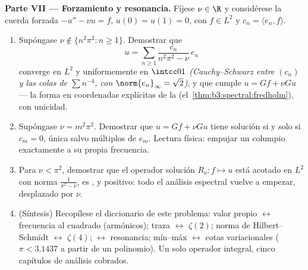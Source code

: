 \begin{problem}
\medskip
\noindent\textbf{Parte VII --- Forzamiento y resonancia.} Fíjese
$\nu \in \R$ y considérese la cuerda forzada $-u'' - \nu u =
f$, $u(0) = u(1) = 0$, con $f \in L^2$ y $c_n = \langle
e_n, f\rangle$.
\begin{enumerate}[resume]
  \item Supóngase $\nu \notin \{n^2\pi^2 : n \geq 1\}$. Demostrar que
        \[
        u = \sum_{n\geq1}\frac{c_n}{n^2\pi^2 - \nu}\,e_n
        \]
        converge en $L^2$ y uniformemente en $\intcc01$
        \emph{(Cauchy--Schwarz entre $(c_n)$ y las colas de
        $\sum n^{-4}$, con $\norm{e_n}_\infty =
        \sqrt2$)}, y que cumple $u = Gf + \nu Gu$ --- la forma en
        coordenadas explícitas de la
        (el~\cref{thm:b3:spectral:fredholm}), con unicidad. \item
        Supóngase $\nu = m^2\pi^2$. Demostrar que $u = Gf + \nu
        Gu$ tiene solución si y solo si $c_m = 0$, única salvo múltiplos
        de $e_m$. Lectura física: empujar un columpio exactamente a su
        propia frecuencia. \item Para $\nu < \pi^2$, demostrar que el
        operador solución $R_\nu\colon f \mapsto u$ está acotado en
        $L^2$ con norma $\frac1{\pi^2 - \nu}$, es
        ,
         y positivo:
        todo el análisis espectral vuelve a empezar, desplazado por
        $\nu$. \item (Síntesis) Recopílese el diccionario de este
        problema: valor propio $\leftrightarrow$ frecuencia al cuadrado
        (armónicos); traza $\leftrightarrow$ $\zeta(2)$; norma de
        Hilbert--Schmidt $\leftrightarrow$ $\zeta(4)$;
        $\leftrightarrow$ resonancia; mín--máx $\leftrightarrow$ cotas
        variacionales ($\pi <
        3.1437$ a partir de un polinomio). Un solo operador integral,
        cinco capítulos de análisis cobrados.
\end{enumerate}


\end{problem}
